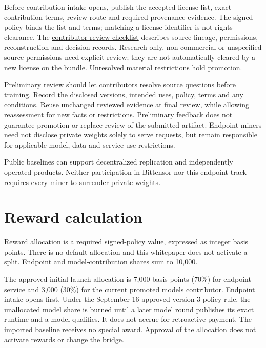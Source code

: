 Before contribution intake opens, publish the accepted-license list, exact
contribution terms, review route and required provenance evidence. The signed
policy binds the list and terms; matching a license identifier is not rights
clearance. The \href{https://github.com/Umi-BitSign/umi/blob/main/docs/contributors/models.md\#model-contribution-review}{contributor review checklist}
describes source lineage, permissions, reconstruction and decision records.
Research-only, non-commercial or unspecified source permissions need explicit
review; they are not automatically cleared by a new license on the bundle.
Unresolved material restrictions hold promotion.

Preliminary review should let contributors resolve source questions before
training. Record the disclosed versions, intended uses, policy, terms and any
conditions. Reuse unchanged reviewed evidence at final review, while allowing
reassessment for new facts or restrictions. Preliminary feedback does not
guarantee promotion or replace review of the submitted artifact. Endpoint
miners need not disclose private weights solely to serve requests, but remain
responsible for applicable model, data and service-use restrictions.

Public baselines can support decentralized replication and independently
operated products. Neither participation in Bittensor nor this endpoint
track requires every miner to surrender private weights.

\section{Reward calculation}\label{7-reward-calculation}

Reward allocation is a required signed-policy value, expressed as integer
basis points. There is no default allocation and this whitepaper does not
activate a split. Endpoint and model-contribution shares sum to 10,000.

The approved initial launch allocation is 7,000 basis points (70\%) for endpoint
service and 3,000 (30\%) for the current promoted model\textquotesingle s contributor. Endpoint
intake opens first. Under the September 16 approved version 3 policy rule, the
unallocated model share is burned until a later model round publishes its exact
runtime and a model qualifies. It does not accrue for retroactive payment. The
imported baseline receives no special award. Approval of the allocation does not
activate rewards or change the bridge.


